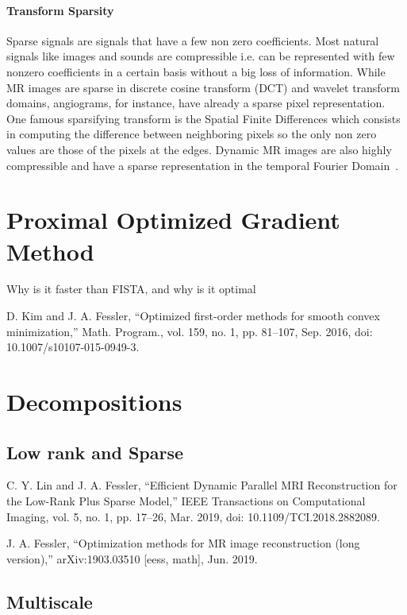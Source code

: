 \paragraph{Transform Sparsity}
 Sparse signals are signals that have a few non zero coefficients. Most natural signals like images and sounds are compressible i.e. can be represented with few nonzero coefficients in a certain basis without a big loss of information. While MR images are sparse in discrete cosine transform (DCT) and wavelet transform domains, angiograms, for instance, have already a sparse pixel representation.  One famous sparsifying transform is the Spatial Finite Differences which consists in computing the difference between neighboring pixels so the only non zero values are those of the pixels at the edges. Dynamic MR images are also highly compressible and have a sparse representation in the temporal Fourier Domain~\cite{parrish, lustig}.

\fi

\section{Proximal Optimized Gradient Method}
Why is it faster than FISTA, and why is it optimal

D. Kim and J. A. Fessler, “Optimized first-order methods for smooth convex minimization,” Math. Program., vol. 159, no. 1, pp. 81–107, Sep. 2016, doi: 10.1007/s10107-015-0949-3.

\section{Decompositions}

\subsection{Low rank and Sparse}
C. Y. Lin and J. A. Fessler, “Efficient Dynamic Parallel MRI Reconstruction for the Low-Rank Plus Sparse Model,” IEEE Transactions on Computational Imaging, vol. 5, no. 1, pp. 17–26, Mar. 2019, doi: 10.1109/TCI.2018.2882089.

J. A. Fessler, “Optimization methods for MR image reconstruction (long version),” arXiv:1903.03510 [eess, math], Jun. 2019.

\subsection{Multiscale}

